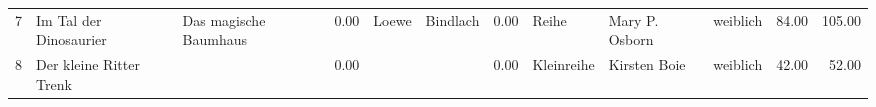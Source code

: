 \begin{table}
\begin{center}
{\begin{tabular}{rllrllrlllrr}
  7 & Im Tal der Dinosaurier                                                                                                                                                                                                                                          & Das magische Baumhaus                                                                                                                                                                                                                                           & 0.00 & Loewe                                                                                                                                                                                                                                                           & Bindlach                                                                                                                                                                                                                                                        & 0.00 & Reihe & Mary P. Osborn                                                                                                                                                                                                                                                  & weiblich & 84.00 & 105.00 \\ 
  8 & Der kleine Ritter Trenk                                                                                                                                                                                                                                         &                                                                                                                                                                                                                                                                 & 0.00 &                                                                                                                                                                                                                                                                 &                                                                                                                                                                                                                                                                 & 0.00 & Kleinreihe & Kirsten Boie                                                                                                                                                                                                                                                    & weiblich & 42.00 & 52.00 \\ 

\end{tabular}}
\end{center}
\end{table}
